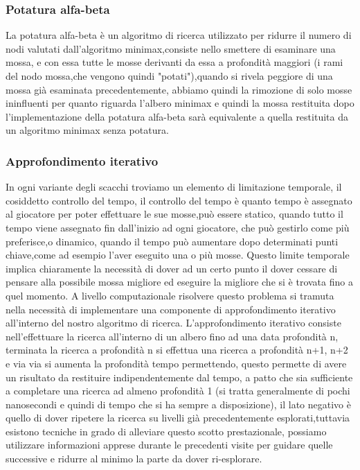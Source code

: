 \subsubsection{Potatura alfa-beta}
La potatura alfa-beta è un algoritmo di ricerca utilizzato per ridurre il numero di nodi valutati dall'algoritmo 
minimax,consiste nello smettere di esaminare una mossa, e con essa tutte le mosse derivanti da essa a profondità maggiori
(i rami del nodo mossa,che vengono quindi "potati"),quando si rivela peggiore di una mossa già esaminata precedentemente,
abbiamo quindi la rimozione di solo mosse ininfluenti per quanto riguarda l'albero minimax e quindi la mossa
restituita dopo l'implementazione della potatura alfa-beta sarà equivalente a quella restituita da un algoritmo
minimax senza potatura.

\subsubsection{Approfondimento iterativo}
In ogni variante degli scacchi troviamo un elemento di limitazione temporale, il cosiddetto controllo del tempo,
il controllo del tempo è quanto tempo è assegnato al giocatore per poter effettuare le sue mosse,può essere statico,
quando tutto il tempo viene assegnato fin dall'inizio ad ogni giocatore, che può gestirlo come più preferisce,o dinamico,
quando il tempo può aumentare dopo determinati punti chiave,come ad esempio l'aver eseguito una o più mosse.
Questo limite temporale implica chiaramente la necessità di dover ad un certo punto il dover cessare di pensare alla 
possibile mossa migliore ed eseguire la migliore che si è trovata fino a quel momento.
A livello computazionale risolvere questo problema si tramuta nella necessità di implementare una componente di approfondimento
iterativo all'interno del nostro algoritmo di ricerca.
L'approfondimento iterativo consiste nell'effettuare la ricerca all'interno di un albero fino ad una data profondità n,
terminata la ricerca a profondità n si effettua una ricerca a profondità n+1, n+2 e via via si aumenta la profondità tempo permettendo,
questo permette di avere un risultato da restituire indipendentemente dal tempo, a patto che sia sufficiente a completare una 
ricerca ad almeno profondità 1 (si tratta generalmente di pochi nanosecondi e quindi di tempo che si ha sempre a disposizione), il lato negativo
è quello di dover ripetere la ricerca su livelli già precedentemente esplorati,tuttavia esistono tecniche in grado di alleviare questo scotto prestazionale,
possiamo utilizzare informazioni apprese durante le precedenti visite per guidare quelle successive e ridurre al minimo la parte da dover ri-esplorare.
